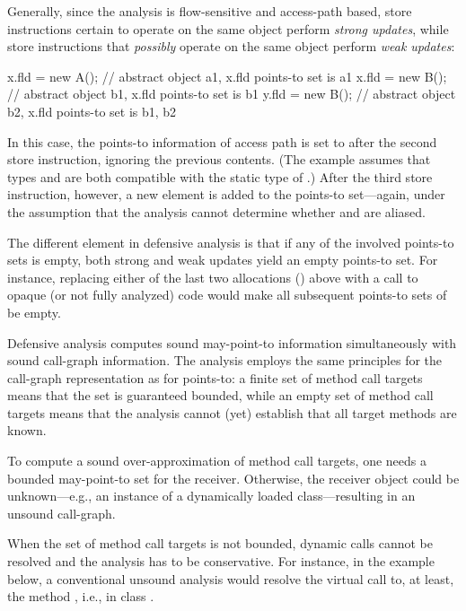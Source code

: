 Generally, since the analysis is flow-sensitive and access-path based, store instructions certain to operate on the same object perform \emph{strong updates}, while store instructions that \emph{possibly} operate on the same object perform \emph{weak updates}:

\begin{javaBox}
x.fld = new A();  // abstract object a1, x.fld points-to set is {a1}
x.fld = new B();  // abstract object b1, x.fld points-to set is {b1} 
y.fld = new B();  // abstract object b2, x.fld points-to set is {b1, b2}
\end{javaBox}

In this case, the points-to information of access path  is set to  after the second store instruction, ignoring the previous contents. (The example assumes that types  and  are both compatible with the static type of .) After the third store instruction, however, a new element is added to the points-to set---again, under the assumption that the analysis cannot determine whether  and  are aliased.

The different element in defensive analysis is that if any of the involved points-to sets is empty, both strong and weak updates yield an empty points-to set. For instance, replacing either of the last two allocations () above with a call to opaque (or not fully analyzed) code would make all subsequent points-to sets of  be empty.


Defensive analysis computes sound may-point-to information simultaneously with sound call-graph information. The analysis employs the same principles for the call-graph representation as for points-to: a finite set of method call targets means that the set is guaranteed bounded, while an empty set of method call targets means that the analysis cannot (yet) establish that all target methods are known.

To compute a sound over-approximation of method call targets, one needs a bounded may-point-to set for the receiver. Otherwise, the receiver object could be unknown---e.g., an instance of a dynamically loaded class---resulting in an unsound call-graph.

When the set of method call targets is not bounded, dynamic calls cannot be resolved and the analysis has to be conservative. For instance, in the example below, a conventional unsound analysis would resolve the virtual call  to, at least, the method , i.e.,  in class .

